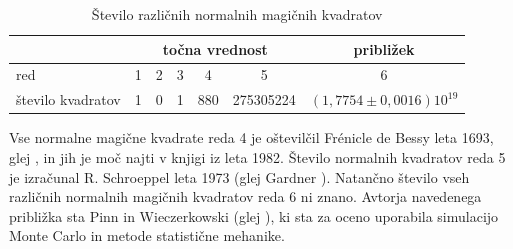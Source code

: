 \documentclass[a4paper,12pt]{article}
\begin{document}
\begin{table}[!ht]
      \centering
      \caption{Število različnih normalnih magičnih kvadratov}
      \label{table:stevila}
           \begin{tabular}{l c c c c c c}\toprule
             &\multicolumn{5}{c}{točna vrednost}&približek\\
             \midrule
             red& 1& 2& 3& 4& 5& 6\\
             število kvadratov &1& 0& 1& 880& 275305224&\((1{,}7754\pm0{,}0016)10^{19}\)\\      
           \bottomrule
            \end{tabular}
\end{table}

Vse normalne magične kvadrate reda 4 je oštevilčil Frénicle de Bessy
leta 1693, glej \cite{bessy}, in jih je moč najti v knjigi \cite{berlekamp}
iz leta 1982. Število normalnih kvadratov reda 5 je izračunal
R. Schroeppel leta 1973 (glej Gardner \cite{gardner}).
Natančno število vseh različnih normalnih magičnih kvadratov reda 6 ni znano.
Avtorja navedenega približka sta Pinn in Wieczerkowski (glej \cite{pinn}), ki
sta za oceno uporabila simulacijo Monte Carlo in metode statistične mehanike.
\cite{bessy, berlekamp, gardner, pinn} %


\newpage



\end{document}
